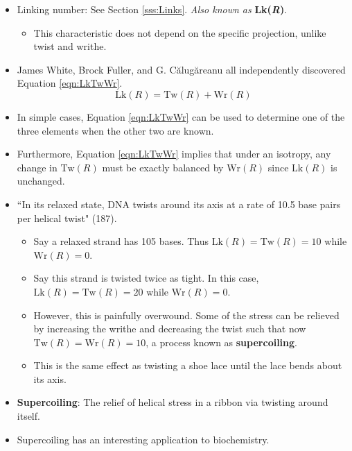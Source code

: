 \documentclass[titlepage]{article}
\numberwithin{figure}{section}
\numberwithin{table}{section}
\numberwithin{equation}{section}
\newcommand{\dq}[2]{``#1" (#2).}
\begin{document}
\begin{itemize}
    \item Linking number: See Section \ref{sss:Links}. \emph{Also known as} \textbf{Lk(\emph{R})}.
    \begin{itemize}
        \item This characteristic does not depend on the specific projection, unlike twist and writhe.
    \end{itemize}
    \item James White, Brock Fuller, and G. C\u{a}lug\u{a}reanu all independently discovered Equation \ref{eqn:LkTwWr}.
    \begin{equation}\label{eqn:LkTwWr}
        \text{Lk}(R)=\text{Tw}(R)+\text{Wr}(R)
    \end{equation}
    \item In simple cases, Equation \ref{eqn:LkTwWr} can be used to determine one of the three elements when the other two are known.
    \item Furthermore, Equation \ref{eqn:LkTwWr} implies that under an isotropy, any change in $\text{Tw}(R)$ must be exactly balanced by $\text{Wr}(R)$ since $\text{Lk}(R)$ is unchanged.
    \item \dq{In its relaxed state, DNA twists around its axis at a rate of 10.5 base pairs per helical twist}{187}
    \begin{itemize}
        \item Say a relaxed strand has 105 bases. Thus $\text{Lk}(R)=\text{Tw}(R)=10$ while $\text{Wr}(R)=0$.
        \item Say this strand is twisted twice as tight. In this case, $\text{Lk}(R)=\text{Tw}(R)=20$ while $\text{Wr}(R)=0$.
        \item However, this is painfully overwound. Some of the stress can be relieved by increasing the writhe and decreasing the twist such that now $\text{Tw}(R)=\text{Wr}(R)=10$, a process known as \textbf{supercoiling}.
        \item This is the same effect as twisting a shoe lace until the lace bends about its axis.
    \end{itemize}
    \item \textbf{Supercoiling}: The relief of helical stress in a ribbon via twisting around itself.
    \item Supercoiling has an interesting application to biochemistry.
    \begin{figure}[h!]
        \centering
\end{figure}
\end{itemize}
\end{document}
